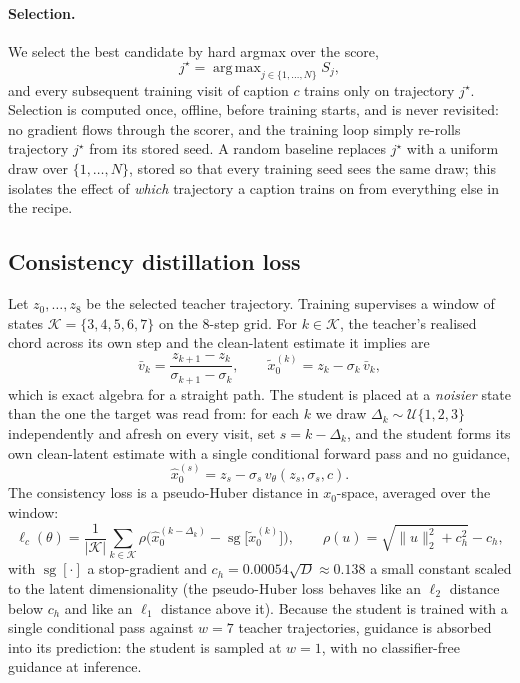 \documentclass{article} %
\DeclareMathOperator*{\argmaxop}{arg\,max}
\DeclareMathOperator{\sgop}{sg}
\begin{document}
\paragraph{Selection.} We select the best candidate by hard argmax over the score,
\begin{equation}
j^\star=\argmaxop_{j\in\{1,\dots,N\}}S_j ,
\label{eq:argmax}
\end{equation}
and every subsequent training visit of caption $c$ trains only on trajectory $j^\star$. Selection is
computed once, offline, before training starts, and is never revisited: no gradient flows through
the scorer, and the training loop simply re-rolls trajectory $j^\star$ from its stored seed. A random
baseline replaces $j^\star$ with a uniform draw over $\{1,\dots,N\}$, stored so that every training
seed sees the same draw; this isolates the effect of \emph{which} trajectory a caption trains on
from everything else in the recipe.

\subsection{Consistency distillation loss}
\label{sec:cd}
Let $z_0,\dots,z_8$ be the selected teacher trajectory. Training supervises a window of states
$\mathcal K=\{3,4,5,6,7\}$ on the 8-step grid. For $k\in\mathcal K$, the teacher's realised chord
across its own step and the clean-latent estimate it implies are
\begin{equation}
\bar v_k=\frac{z_{k+1}-z_k}{\sigma_{k+1}-\sigma_k},\qquad
\tilde x_0^{(k)}=z_k-\sigma_k\,\bar v_k ,
\end{equation}
which is exact algebra for a straight path. The student is placed at a \emph{noisier} state than the
one the target was read from: for each $k$ we draw $\Delta_k\sim\mathcal U\{1,2,3\}$ independently and
afresh on every visit, set $s=k-\Delta_k$, and the student forms its own clean-latent estimate with a
single conditional forward pass and no guidance,
\begin{equation}
\hat x_0^{(s)}=z_s-\sigma_s\,v_\theta(z_s,\sigma_s,c).
\end{equation}
The consistency loss is a pseudo-Huber distance in $x_0$-space, averaged over the window:
\begin{equation}
\ell_c(\theta)=\frac{1}{|\mathcal K|}\sum_{k\in\mathcal K}\rho\Big(\hat x_0^{(k-\Delta_k)}-\sgop\big[\tilde x_0^{(k)}\big]\Big),
\qquad \rho(u)=\sqrt{\lVert u\rVert_2^2+c_h^2}-c_h ,
\label{eq:cdloss}
\end{equation}
with $\sgop[\cdot]$ a stop-gradient and $c_h=0.00054\sqrt D\approx0.138$ a small constant scaled to
the latent dimensionality (the pseudo-Huber loss behaves like an $\ell_2$ distance below $c_h$ and
like an $\ell_1$ distance above it).
Because the student is trained with a single conditional pass against $w{=}7$ teacher trajectories,
guidance is absorbed into its prediction: the student is sampled at $w{=}1$, with no classifier-free
guidance at inference.
\end{document}
